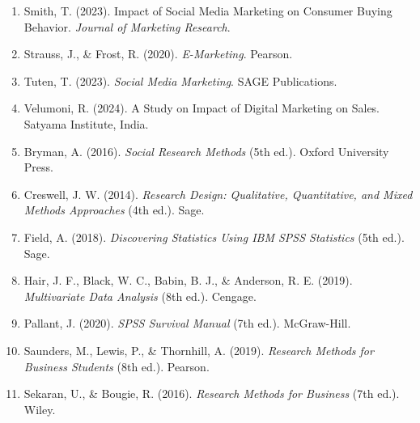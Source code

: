 \documentclass[12pt, a4paper]{report}
\begin{document}
\begin{enumerate}[label=\arabic*.]
  \item Smith, T. (2023). Impact of Social Media Marketing on Consumer Buying Behavior. \textit{Journal of Marketing Research}.
  \item Strauss, J., \& Frost, R. (2020). \textit{E-Marketing}. Pearson.
  \item Tuten, T. (2023). \textit{Social Media Marketing}. SAGE Publications.
  \item Velumoni, R. (2024). A Study on Impact of Digital Marketing on Sales. Satyama Institute, India.
  \item Bryman, A. (2016). \textit{Social Research Methods} (5th ed.). Oxford University Press.
  \item Creswell, J. W. (2014). \textit{Research Design: Qualitative, Quantitative, and Mixed Methods Approaches} (4th ed.). Sage.
  \item Field, A. (2018). \textit{Discovering Statistics Using IBM SPSS Statistics} (5th ed.). Sage.
  \item Hair, J. F., Black, W. C., Babin, B. J., \& Anderson, R. E. (2019). \textit{Multivariate Data Analysis} (8th ed.). Cengage.
  \item Pallant, J. (2020). \textit{SPSS Survival Manual} (7th ed.). McGraw-Hill.
  \item Saunders, M., Lewis, P., \& Thornhill, A. (2019). \textit{Research Methods for Business Students} (8th ed.). Pearson.
  \item Sekaran, U., \& Bougie, R. (2016). \textit{Research Methods for Business} (7th ed.). Wiley.
\end{enumerate}
\end{document}
